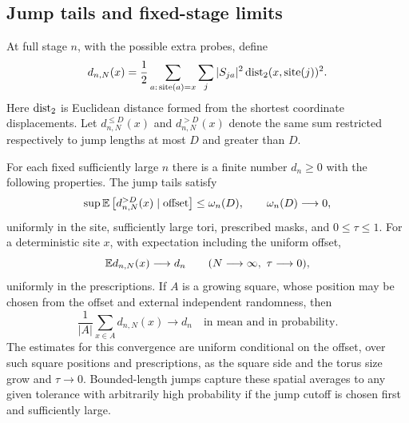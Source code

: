 \subsection{Jump tails and fixed-stage limits}

At full stage $n$, with the possible extra probes, define
\begin{equation}
 d_{n,N}(x)=\frac12
 \sum_{a:\,\operatorname{site}(a)=x}\sum_j
       |S_{ja}|^2\operatorname{dist}_2(x,\operatorname{site}(j))^2.
 \label{screen:local-energy}
\end{equation}
Here $\operatorname{dist}_2$ is Euclidean distance formed from the shortest
coordinate displacements. Let $d_{n,N}^{\leq D}(x)$ and
$d_{n,N}^{>D}(x)$ denote the same sum restricted respectively to jump
lengths at most $D$ and greater than $D$.

\begin{proposition}
\label{screen:limits}
For each fixed sufficiently large $n$ there is a finite number
$d_n\geq0$ with the following properties.
The jump tails satisfy
\begin{equation}
 \sup\mathbb E\left[d_{n,N}^{>D}(x)\mid\text{offset}\right]
       \leq\omega_n(D),\qquad \omega_n(D)\longrightarrow0,
 \label{screen:jump-tail}
\end{equation}
uniformly in the site, sufficiently large tori, prescribed masks, and
$0\leq\tau\leq1$.
For a deterministic site $x$, with expectation including the uniform
offset,
\begin{equation}
 \mathbb E d_{n,N}(x)\longrightarrow d_n
       \qquad (N\longrightarrow\infty,\ \tau\longrightarrow0),
 \label{screen:point-limit}
\end{equation}
uniformly in the prescriptions.
If $A$ is a growing square, whose position may be chosen from the
offset and external independent randomness, then
\begin{equation}
 \frac1{|A|}\sum_{x\in A}d_{n,N}(x)\longrightarrow d_n
       \quad\text{in mean and in probability}.
 \label{screen:spatial-limit}
\end{equation}
The estimates for this convergence are uniform conditional on the
offset, over such square positions and prescriptions, as the square
side and the torus size grow and $\tau\to0$.
Bounded-length jumps capture these spatial averages to any given
tolerance with arbitrarily high probability if the jump cutoff is
chosen first and sufficiently large.
\end{proposition}


